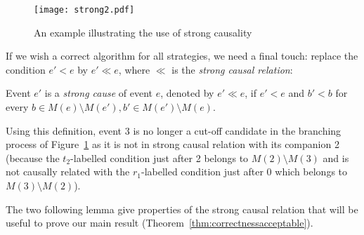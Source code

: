 \documentclass{llncs}
\def\scause{\ll}
\newcommand{\ma}[1]{M(#1)}
\begin{document}
\begin{figure}[htbp]
\centering
\texttt{[image: strong2.pdf]}
\caption{An example illustrating the use of strong causality}\label{fig:strong}
\end{figure}

If we wish a correct algorithm for all strategies, we need a final touch: replace the condition $e' < e$ by $e' \scause e$, where $\scause$ is the {\em strong causal relation}:
\begin{definition}
Event $e'$ is a {\em strong cause} of event $e$, denoted by $e' \scause e$,
if $e' < e$ and $ b' < b$ for every $b \in \ma{e} \setminus \ma{e'}, b' \in \ma{e'} \setminus \ma{e}$. 
\end{definition}

Using this definition, event 3 is no longer a cut-off candidate in the branching process of Figure~\ref{fig:strong} as it is not in strong causal relation with its companion 2 (because the $t_2$-labelled condition just after 2 belongs to $\ma{2}\setminus\ma{3}$ and is not causally related with the $r_1$-labelled condition just after $0$ which belongs to $\ma{3}\setminus\ma{2}$).

The two following lemma give properties of the strong causal relation that will be useful to prove our main result (Theorem~\ref{thm:correctnessacceptable}).
\end{document}
